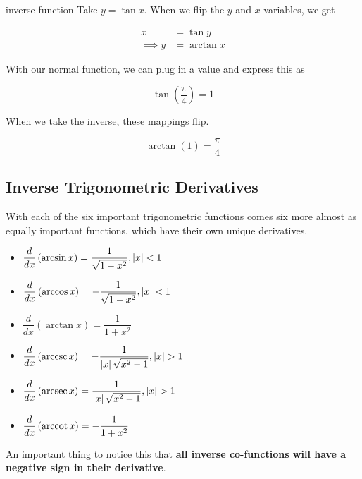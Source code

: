 \begin{example}{inverse function}
    Take \( y = \tan{x} \). When we flip the \( y \) and \( x \) variables, we get
    
    \begin{align*}
        x &= \tan{y} \\
        \implies y &= \arctan{x}
    \end{align*}
    
    With our normal function, we can plug in a value and express this as
    
    \[ \tan{\left( \dfrac{\pi}{4} \right)} = 1 \]
    
    When we take the inverse, these mappings flip.
    
    \[ \arctan{\left( 1 \right)} = \dfrac{\pi}{4} \]
\end{example}

\subsection{Inverse Trigonometric Derivatives}

With each of the six important trigonometric functions comes six more almost as equally important  functions, which have their own unique derivatives.

\begin{multicols}{2}
\begin{itemize}
    \item \( \dfrac{d}{dx} \left( \arcsin{x} \right) = \dfrac{1}{\sqrt{1 - x^2}}, \left\lvert {x} \right\rvert < 1 \)
    \item \( \dfrac{d}{dx} \left( \arccos{x} \right) = -\dfrac{1}{\sqrt{1 - x^2}}, \left\lvert {x} \right\rvert < 1 \)
    \item \( \dfrac{d}{dx} \left( \arctan{x} \right) = \dfrac{1}{1 + x^2} \)
    \item \( \dfrac{d}{dx} \left( \operatorname{arccsc}{x} \right) = -\dfrac{1}{\left\lvert {x} \right\rvert \sqrt{x^2 - 1}}, \left\lvert {x} \right\rvert > 1 \)
    \item \( \dfrac{d}{dx} \left( \operatorname{arcsec}{x} \right) = \dfrac{1}{\left\lvert {x} \right\rvert \sqrt{x^2 - 1}}, \left\lvert {x} \right\rvert > 1 \)
    \item \( \dfrac{d}{dx} \left( \operatorname{arccot}{x} \right) = -\dfrac{1}{1 + x^2} \)
\end{itemize}
\end{multicols}

An important thing to notice this that \textbf{all inverse co-functions will have a negative sign in their derivative}.

